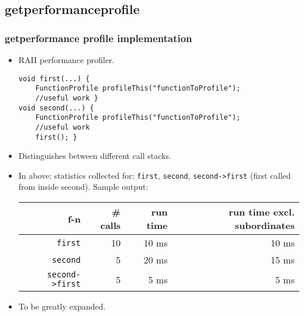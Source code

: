 \subsection{getperformanceprofile}
\begin{frame}[fragile]
\frametitle{getperformance profile implementation}
\begin{itemize}
\item RAII performance profiler.
\begin{verbatim}
void first(...) {
    FunctionProfile profileThis("functionToProfile");
    //useful work }
void second(...) {
    FunctionProfile profileThis("functionToProfile");
    //useful work
    first(); }
\end{verbatim}
\item Distinguishes between different call stacks. 
\item In above: statistics collected for: \verb|first|, \verb|second|, \verb|second->first| (first called from inside second). Sample output:
\begin{tabular}{|r|r|r|r|}\hline
f-n& \# calls & run time& run time excl. subordinates \\\hline
\verb|first| & 10& 10 ms & 10 ms\\\hline
\verb|second| & 5& 20 ms& 15 ms\\\hline
\verb|second->first|& 5& 5 ms & 5 ms\\\hline
\end{tabular}
\item To be greatly expanded.
\end{itemize}
\end{frame}

